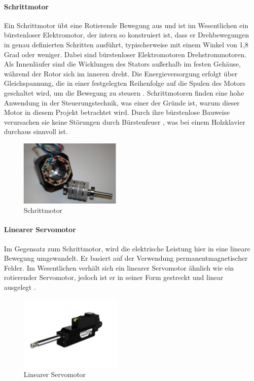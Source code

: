 \paragraph{Schrittmotor}

Ein Schrittmotor übt eine Rotierende Bewegung aus und ist im Wesentlichen ein bürstenloser Elektromotor, der intern so konstruiert ist,
dass er Drehbewegungen in genau definierten Schritten ausführt, typischerweise mit einem Winkel von 1,8 Grad oder weniger.
Dabei sind bürstenloser Elektromotoren Drehstrommotoren. Als Innenläufer sind die Wicklungen des Stators außerhalb im festen Gehäuse,
während der Rotor sich im inneren dreht.
Die Energieversorgung erfolgt über Gleichspannung, die in einer festgelegten Reihenfolge auf die Spulen des Motors
geschaltet wird, um die Bewegung zu steuern \cite*[vgl.][]{Aufbau.Elektromotoren}.
Schrittmotoren finden eine hohe Anwendung in der Steuerungstechnik, was einer der Gründe ist, warum dieser Motor in diesem
Projekt betrachtet wird. Durch ihre bürstenlose Bauweise verursachen sie keine Störungen durch Bürstenfeuer \cite*[vgl.][]{Aufbau.Elektromotoren}, was bei einem
Holzklavier durchaus sinnvoll ist.

\begin{figure}[htbp]
	\centering
	\includegraphics[width=5cm]{img/Schrittmotor}
	\caption{Schrittmotor \cite*{Aufbau.Elektromotoren}}
	\label{fig:Linearmotor}
\end{figure}

\paragraph{Linearer Servomotor}
Im Gegensatz zum Schrittmotor, wird die elektrische Leistung hier in eine lineare Bewegung umgewandelt. Er basiert auf der
Verwendung permanentmagnetischer Felder. Im Wesentlichen
verhält sich ein linearer Servomotor ähnlich wie ein rotierender Servomotor, jedoch ist er in seiner Form gestreckt und linear ausgelegt \cite*[vgl.][]{Linearer.Servo}.

\begin{figure}[htbp]
	\centering
	\includegraphics[width=5cm]{img/LinServo}
	\caption{Linearer Servomotor \cite*{rei.ReicheltLinearerServomotor.}}
	\label{fig:Servomotor}
\end{figure}

